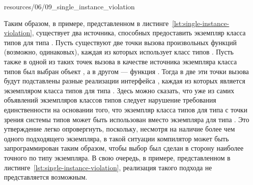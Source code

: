 
{resources/06/09_single_instance_violation}

Таким образом, в примере, представленном в листинге~\ref{lst:single-instance-violation}, существует два источника, способных предоставить экземпляр класса типов  для типа . Пусть существуют две точки вызова произвольных функций (возможно, одинаковых), каждая из которых использует класс типов . Пусть также в одной из таких точек вызова в качестве источника экземпляра класса типов был выбран объект , а в другом --- функция . Тогда в две эти точки вызова будут подставлены разные реализации интерфейса , каждая из которых является экземпляром класса типов  для типа . Здесь можно сказать, что уже из самих объявлений экземпляров классов типов следует нарушение требования единственности на основании того, что экземпляр класса типов  для типа  с точки зрения системы типов может быть использован вместо экземпляра для типа . Это утверждение легко опровергнуть, поскольку, несмотря на наличие более чем одного подходящего экземпляра, в такой ситуации компилятор может быть запрограммирован таким образом, чтобы выбор был сделан в сторону наиболее точного по типу экземпляра. В свою очередь, в примере, представленном в листинге~\ref{lst:single-instance-violation}, реализация такого подхода не представляется возможным.   


